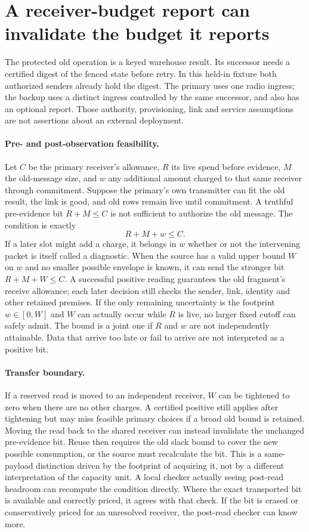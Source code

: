 \documentclass{article}
\begin{document}
\section*{A receiver-budget report can invalidate the budget it reports}
The protected old operation is a keyed warehouse result. Its successor
needs a certified digest of the fenced state before retry. In this
held-in fixture both authorized senders already hold the digest. The
primary uses one radio ingress; the backup uses a distinct ingress
controlled by the same successor, and also has an optional report.
Those authority, provisioning, link and service assumptions are not
assertions about an external deployment.

\paragraph{Pre- and post-observation feasibility.}
Let $C$ be the primary receiver's allowance, $R$ its live spend
before evidence, $M$ the old-message size, and $w$ any additional
amount charged to that same receiver through commitment. Suppose
the primary's own transmitter can fit the old result, the link is
good, and old rows remain live until commitment. A truthful
pre-evidence bit $R+M\le C$ is not sufficient to authorize the old
message. The condition is exactly
\[
                 R+M+w\le C .
\]
If a later slot might add a charge, it belongs in $w$ whether or not
the intervening packet is itself called a diagnostic. When the source
has a valid upper bound $W$ on $w$ and no smaller possible envelope
is known, it can send the stronger bit $R+M+W\le C$. A successful
positive reading guarantees the old fragment's receive allowance;
each later decision still checks the sender, link, identity and other
retained premises. If the only remaining uncertainty is the footprint
$w\in[0,W]$ and $W$ can actually occur while $R$ is live, no larger
fixed cutoff can safely admit. The bound is a joint one if $R$ and $w$
are not independently attainable. Data that arrive too late or fail
to arrive are not interpreted as a positive bit.

\paragraph{Transfer boundary.}
If a reserved read is moved to an independent receiver, $W$ can be
tightened to zero when there are no other charges. A certified
positive still applies after tightening but may miss feasible
primary choices if a broad old bound is retained. Moving the read
back to the shared receiver can instead invalidate the unchanged
pre-evidence bit. Reuse then requires the old slack bound to
cover the new possible consumption, or the source must recalculate
the bit. This is a same-payload distinction driven by the footprint
of acquiring it, not by a different interpretation of the capacity
unit. A local checker actually seeing post-read headroom can
recompute the condition directly. Where the exact transported bit is
available and correctly priced, it agrees with that check. If the
bit is erased or conservatively priced for an unresolved receiver,
the post-read checker can know more.
\end{document}
